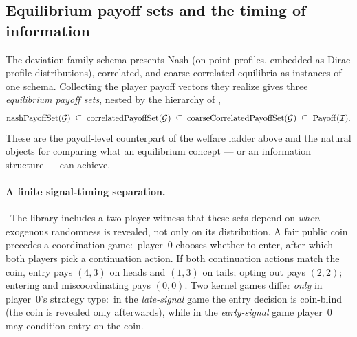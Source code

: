 
\subsection{Equilibrium payoff sets and the timing of information}
\label{sec:solution-concepts:signal-timing}

The deviation-family schema presents Nash (on point profiles, embedded
as Dirac profile distributions), correlated, and coarse correlated
equilibria as instances of one schema.  Collecting the player payoff
vectors they realize gives three \emph{equilibrium payoff sets}, nested
by the hierarchy of ,
\[
  \mathrm{nashPayoffSet}(\mathcal{G})
  \;\subseteq\;
  \mathrm{correlatedPayoffSet}(\mathcal{G})
  \;\subseteq\;
  \mathrm{coarseCorrelatedPayoffSet}(\mathcal{G})
  \;\subseteq\; \mathrm{Payoff}(\mathcal{I}).
\]
These are the payoff-level counterpart of the welfare ladder above and
the natural objects for comparing what an equilibrium concept — or an
information structure — can achieve.

\paragraph{A finite signal-timing separation.}\
The library includes a two-player witness that these sets depend on
\emph{when} exogenous randomness is revealed, not only on its
distribution.  A fair public coin precedes a coordination game:\
player~$0$ chooses whether to \textsf{enter}, after which both players
pick a continuation action.  If both continuation actions match the
coin, entry pays $(4,3)$ on heads and $(1,3)$ on tails; opting out pays
$(2,2)$; entering and miscoordinating pays $(0,0)$.  Two kernel games
differ \emph{only} in player~$0$'s strategy type:\ in the
\emph{late-signal} game the entry decision is coin-blind (the coin is
revealed only afterwards), while in the \emph{early-signal} game
player~$0$ may condition entry on the coin.

